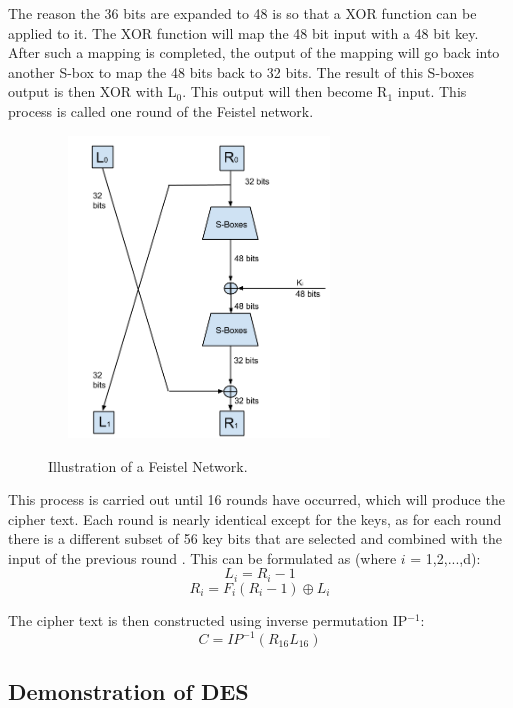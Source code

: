 \documentclass[11pt,a4paper, notitlepage]{report}
\begin{document}
The reason the 36 bits are expanded to 48 is so that a XOR function can be applied to it. The XOR function will map the 48 bit input with a 48 bit key. After such a mapping is completed, the output of the mapping will go back into another S-box to map the 48 bits back to 32 bits. The result of this S-boxes output is then XOR with L$_{0}$. This output will then become R$_{1}$ input. This process is called one round of the Feistel network.
\begin{figure}[h]
\centering
\includegraphics[width=8cm, height=8cm]{FeistelNet.png}
\label{Fig: Feistel Network}
\caption{Illustration of a Feistel Network.}
\end{figure}

This process is carried out until 16 rounds have occurred, which will produce the cipher text. Each round is nearly identical except for the keys, as for each round there is a different subset of 56
key bits that are selected and combined with the input of the previous round \cite{Fabio2000LogicalSAT}.
This can be formulated as (where $i$ = 1,2,...,d):
\begin{displaymath}
L_{i} = R_{i}-1
\end{displaymath}
\begin{displaymath}
R_{i} = F_{i} (R_{i}-1) \oplus L_{i}
\end{displaymath}

The cipher text is then constructed using inverse permutation IP$^{-1}$:
\begin{displaymath}
C = IP^{-1}(R_{16}L_{16})
\end{displaymath}


\subsection{Demonstration of DES}
\label{subsec: DemoDES}
\end{document}
